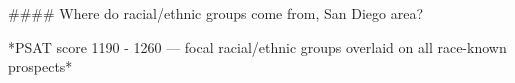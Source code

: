 #### Where do racial/ethnic groups come from, San Diego area?

*PSAT score 1190 - 1260 — focal racial/ethnic groups overlaid on all race-known prospects*
